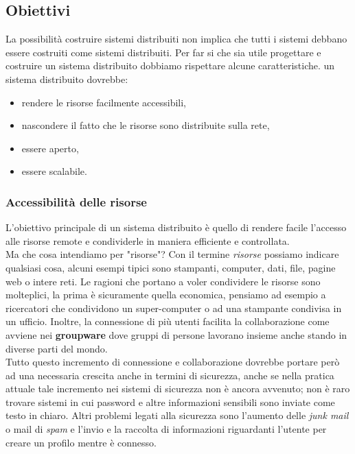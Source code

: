 \subsection{Obiettivi}
La possibilità costruire sistemi distribuiti non implica che tutti i sistemi debbano essere costruiti come sistemi distribuiti. Per far si che sia utile progettare e costruire un sistema distribuito dobbiamo rispettare alcune caratteristiche. un sistema distribuito dovrebbe:
\begin{itemize}
\item rendere le risorse facilmente accessibili,
\item nascondere il fatto che le risorse sono distribuite sulla rete,
\item essere aperto,
\item essere scalabile.
\end{itemize}
\subsubsection{Accessibilità delle risorse}
L'obiettivo principale di un sistema distribuito è quello di rendere facile l'accesso alle risorse remote e condividerle in maniera efficiente e controllata.\\
Ma che cosa intendiamo per "risorse"? Con il termine \emph{risorse} possiamo indicare qualsiasi cosa, alcuni esempi tipici sono stampanti, computer, dati, file, pagine web o intere reti.
Le ragioni che portano a voler condividere le risorse sono molteplici, la prima è sicuramente quella economica, pensiamo ad esempio a ricercatori che condividono un super-computer o ad una stampante condivisa in un ufficio. Inoltre, la connessione di più utenti facilita la collaborazione come avviene nei \textbf{groupware} dove gruppi di persone lavorano insieme anche stando in diverse parti del mondo.\\
Tutto questo incremento di connessione e collaborazione dovrebbe portare però ad una necessaria crescita anche in termini di sicurezza, anche se nella pratica attuale tale incremento nei sistemi di sicurezza non è ancora avvenuto; non è raro trovare sistemi in cui password e altre informazioni sensibili sono inviate come testo in chiaro. Altri problemi legati alla sicurezza sono l'aumento delle \emph{junk mail} o mail di \emph{spam} e l'invio e la raccolta di informazioni riguardanti l'utente per creare un profilo mentre è connesso.
